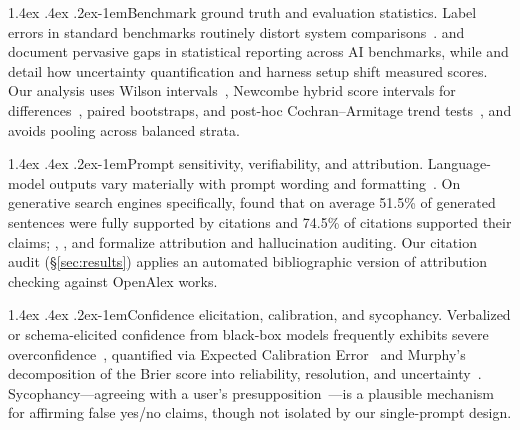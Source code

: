 \documentclass[11pt]{article}
\makeatletter
\renewcommand\paragraph{\@startsection{paragraph}{4}{\z@}%
  {1.4ex \@plus .4ex \@minus .2ex}{-1em}{\normalfont\normalsize\bfseries}}
\makeatother
\begin{document}
\paragraph{Benchmark ground truth and evaluation statistics.}
Label errors in standard benchmarks routinely distort system comparisons~\citep{northcutt2021labelerrors,beyer2020imagenet,gema2024mmlu}. \citet{bowman2021fix} and \citet{reuel2024betterbench} document pervasive gaps in statistical reporting across AI benchmarks, while \citet{miller2024errorbars} and \citet{biderman2024lessons} detail how uncertainty quantification and harness setup shift measured scores. Our analysis uses Wilson intervals~\citep{brown2001interval}, Newcombe hybrid score intervals for differences~\citep{newcombe1998difference}, paired bootstraps, and post-hoc Cochran--Armitage trend tests~\citep{cochran1954chi2,armitage1955trend}, and avoids pooling across balanced strata.

\paragraph{Prompt sensitivity, verifiability, and attribution.}
Language-model outputs vary materially with prompt wording and formatting~\citep{sclar2023prompt,mizrahi2023state}. On generative search engines specifically, \citet{liu2023verifiability} found that on average 51.5\% of generated sentences were fully supported by citations and 74.5\% of citations supported their claims; \citet{rashkin2021ais}, \citet{bohnet2022attributed}, and \citet{ji2022hallucination} formalize attribution and hallucination auditing. Our citation audit (\S\ref{sec:results}) applies an automated bibliographic version of attribution checking against OpenAlex works.

\paragraph{Confidence elicitation, calibration, and sycophancy.}
Verbalized or schema-elicited confidence from black-box models frequently exhibits severe overconfidence~\citep{kadavath2022know,xiong2023uncertainty}, quantified via Expected Calibration Error~\citep{guo2017calibration} and Murphy's decomposition of the Brier score into reliability, resolution, and uncertainty~\citep{murphy1973brier}. Sycophancy---agreeing with a user's presupposition~\citep{sharma2023sycophancy}---is a plausible mechanism for affirming false yes/no claims, though not isolated by our single-prompt design.
\end{document}

